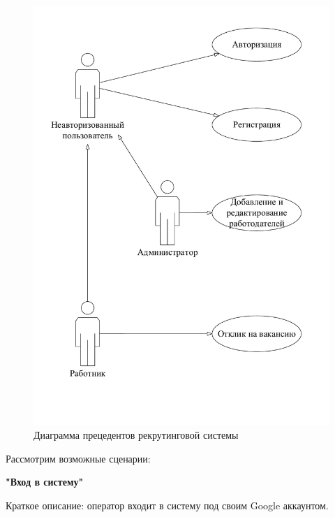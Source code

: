 \begin{figure}[ht]
  \centering
  \includegraphics[width=\textwidth]{include/usecase2.pdf}
  \caption{Диаграмма прецедентов рекрутинговой системы}
  \label{fig:usecase2}
\end{figure}

Рассмотрим возможные сценарии:

\textbf{"Вход в систему"}

Краткое описание: оператор входит в систему под своим Google аккаунтом.

